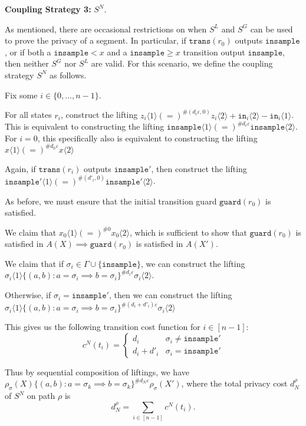 \documentclass[12pt]{article}
\newcommand{\gguard}[1][x]{\texttt{insample}\geq #1}
\newcommand{\lguard}[1][x]{\texttt{insample} < #1}
\newcommand{\brangle}[1]{\langle #1 \rangle}
\newcommand{\guard}{\texttt{guard}}
\newcommand{\trans}{\texttt{trans}}
\theoremstyle{definition}
\begin{document}
\textbf{Coupling Strategy 3:} $S^N$.

As mentioned, there are occasional restrictions on when $S^L$ and $S^G$ can be used to prove the privacy of a segment. In particular, if $\trans(r_0)$ outputs $\texttt{insample}$, or if both a $\lguard$ and a $\gguard$ transition output $\texttt{insample}$, then neither $S^G$ nor $S^L$ are valid. For this scenario, we define the coupling strategy $S^N$ as follows. 

Fix some $i\in\{0, \ldots, n-1\}$. 

For all states $r_i$, construct the lifting $z_i\brangle{1} (=)^{\#(d_i\varepsilon, 0)}z_i\brangle{2}+ \texttt{in}_i\brangle{2}- \texttt{in}_i\brangle{1}$. This is equivalent to constructing the lifting $\texttt{insample}\brangle{1} (=)^{\#d_i\varepsilon}\texttt{insample}\brangle{2}$. For $i=0$, this specifically also is equivalent to constructing the lifting $x\brangle{1} (=)^{\#d_0\varepsilon}x\brangle{2}$

Again, if $\trans(r_i)$ outputs $\texttt{insample}'$, then construct the lifting \\$\texttt{insample}'\brangle{1} (=)^{\#(d'_i, 0)} \texttt{insample}'\brangle{2}$.

As before, we must ensure that the initial transition guard $\guard(r_0)$ is satisfied.

We claim that $x_0\brangle{1}(=)^{\#0}x_0\brangle{2}$, which is sufficient to show that $\guard(r_0)$ is satisfied in $A(X)\implies \guard(r_0)$ is satisfied in $A(X')$.

We claim that if $\sigma_i \in \Gamma\cup\{\texttt{insample}\}$, we can construct the lifting $\sigma_i\brangle{1}\{(a, b): a = \sigma_i \implies b = \sigma_i\}^{\#d_i\varepsilon}\sigma_i\brangle{2}$. 

Otherwise, if $\sigma_i = \texttt{insample}'$, then we can construct the lifting $\sigma_i\brangle{1}\{(a, b): a = \sigma_i \implies b = \sigma_i\}^{\#(d_i+d'_i)\varepsilon}\sigma_i\brangle{2}$

This gives us the following transition cost function for $i\in [n-1]$:
\[
    c^N(t_i) =\begin{cases}
        d_i & \sigma_i \neq \texttt{insample}'\\
        d_i +d'_i& \sigma_i = \texttt{insample}'
    \end{cases}    
\] 


Thus by sequential composition of liftings, we have $\rho_\sigma(X)\{(a, b): a = \sigma_k \implies b = \sigma_k\}^{\#d_N\varepsilon}\rho_\sigma(X')$, where the total privacy cost $d_N^\rho$ of $S^N$ on path $\rho$ is \[d_N^\rho= \sum_{i\in [n-1]} c^N(t_i).\]
\end{document}
